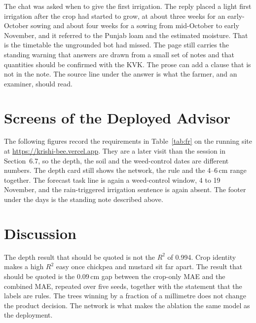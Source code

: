 The chat was asked when to give the first irrigation. The reply placed a light first irrigation after the crop had started to grow, at about three weeks for an early-October sowing and about four weeks for a sowing from mid-October to early November, and it referred to the Punjab loam and the estimated moisture. That is the timetable the ungrounded bot had missed. The page still carries the standing warning that answers are drawn from a small set of notes and that quantities should be confirmed with the KVK. The prose can add a clause that is not in the note. The source line under the answer is what the farmer, and an examiner, should read.

\section{Screens of the Deployed Advisor}
The following figures record the requirements in Table~\ref{tab:fr} on the running site at \url{https://krishi-bee.vercel.app}. They are a later visit than the session in Section~6.7, so the depth, the soil and the weed-control dates are different numbers. The depth card still shows the network, the rule and the 4--6\,cm range together. The forecast task line is again a weed-control window, 4 to 19 November, and the rain-triggered irrigation sentence is again absent. The footer under the days is the standing note described above.





\section{Discussion}
The depth result that should be quoted is not the $R^{2}$ of 0.994. Crop identity makes a high $R^{2}$ easy once chickpea and mustard sit far apart. The result that should be quoted is the 0.09\,cm gap between the crop-only MAE and the combined MAE, repeated over five seeds, together with the statement that the labels are rules. The trees winning by a fraction of a millimetre does not change the product decision. The network is what makes the ablation the same model as the deployment.

